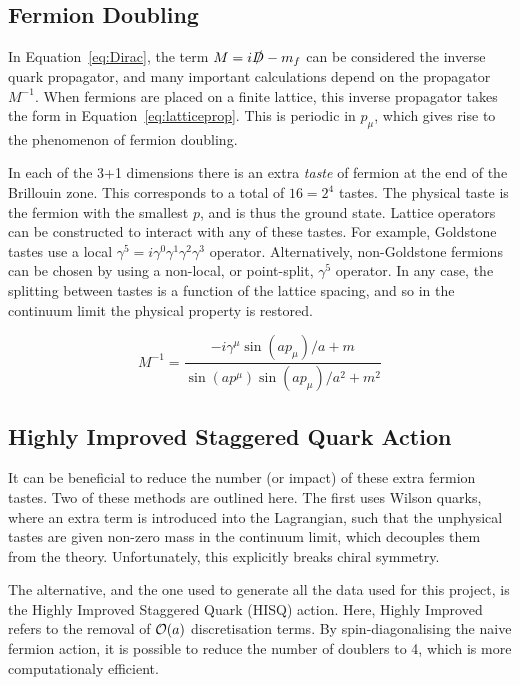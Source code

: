 \documentclass[a4paper,12pt]{article}
\begin{document}
\subsection{Fermion Doubling}
In Equation~\ref{eq:Dirac}, the term $M = i\slashed{D} -m_f$ can be considered the inverse quark propagator, and many important calculations depend on the propagator $M^{-1}$. When fermions are placed on a finite lattice, this inverse propagator takes the form in Equation~\ref{eq:latticeprop}\cite{2016Chakraborty}. This is periodic in $p_\mu$, which gives rise to the phenomenon of fermion doubling.

In each of the 3+1 dimensions there is an extra \emph{taste} of fermion at the end of the Brillouin zone. This corresponds to a total of $16=2^4$ tastes. The physical taste is the fermion with the smallest $p$, and is thus the ground state. Lattice operators can be constructed to interact with any of these tastes. For example, Goldstone tastes use a local $\gamma^5=i \gamma^0\gamma^1\gamma^2\gamma^3$ operator. Alternatively, non-Goldstone fermions can be chosen by using a non-local, or point-split, $\gamma^5$ operator. In any case, the splitting between tastes is a function of the lattice spacing, and so in the continuum limit the physical property is restored.

\begin{equation}
    \label{eq:latticeprop}
    M^{-1} = \frac{-i\gamma^\mu \sin(ap_\mu)/a+m}{\sin(ap^\mu)\sin(ap_\mu)/a^2 + m^2}
\end{equation}

\subsection{Highly Improved Staggered Quark Action}
It can be beneficial to reduce the number (or impact) of these extra fermion tastes. Two of these methods are outlined here. The first uses Wilson quarks\cite{2016Chakraborty}, where an extra term is introduced into the Lagrangian, such that the unphysical tastes are given non-zero mass in the continuum limit, which decouples them from the theory. Unfortunately, this explicitly breaks chiral symmetry.

The alternative, and the one used to generate all the data used for this project, is the Highly Improved Staggered Quark (HISQ) action. Here, Highly Improved refers to the removal of $\order{a}$ discretisation terms. By spin-diagonalising the naive fermion action, it is possible to reduce the number of doublers to 4, which is more computationaly efficient.
\end{document}
